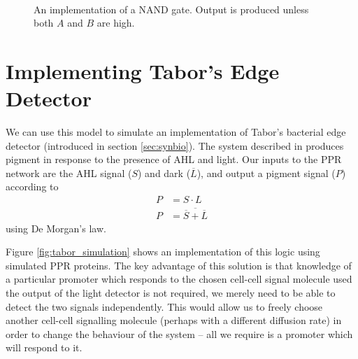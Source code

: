 \begin{figure}
\begin{center}
\begin{subfigure}{0.25\textwidth}
    \end{subfigure}
    ~
    \begin{subfigure}{0.7\textwidth}
      \centering
    \end{subfigure}
  \end{center}
  \caption{An implementation of a NAND gate.
    Output is produced unless both $A$ and $B$ are high.
    \label{fig:nand_simulation}}
\end{figure}

\section{Implementing Tabor's Edge Detector}
\label{sec:sim_tabor}

We can use this model to simulate an implementation of Tabor's bacterial edge 
detector (introduced in section \ref{sec:synbio}).
The system described in \citet{edgeDetector} produces pigment in response to
the presence of AHL and light.
Our inputs to the PPR network are the AHL signal ($S$) and dark
($\overline{L}$), and output a pigment signal ($P$) according to 
\begin{align*}
  P &= S \cdot L \\
  P &= \overline{\overline{S} + \overline{L}}
\end{align*}
using De Morgan's law.

Figure \ref{fig:tabor_simulation} shows an implementation of this logic using
simulated PPR proteins.
The key advantage of this solution is that knowledge of a particular promoter
which responds to the chosen cell-cell signal molecule used the output of the
light detector is not required, we merely need to be able to detect the two
signals independently.
This would allow us to freely choose another cell-cell signalling molecule
(perhaps with a different diffusion rate) in order to change the behaviour of
the system -- all we require is a promoter which will respond to it.

